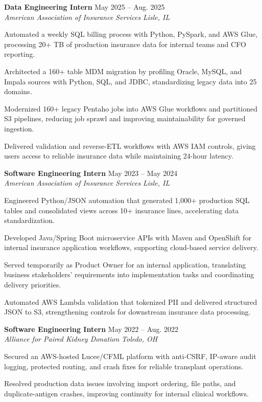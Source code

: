 \documentclass[letterpaper,11pt]{article}
\newcommand{\resumeSubheading}[4]{
  \textbf{#1} \hfill #2\\
  \textit{#3} \hfill \textit{#4}
}
\begin{document}
\resumeSubheading
{Data Engineering Intern}{May 2025 -- Aug. 2025}
{American Association of Insurance Services}{Lisle, IL}
\begin{tightitemize}
  \item Automated a weekly SQL billing process with Python, PySpark, and AWS Glue, processing 20+ TB of production insurance data for internal teams and CFO reporting.
  \item Architected a 160+ table MDM migration by profiling Oracle, MySQL, and Impala sources with Python, SQL, and JDBC, standardizing legacy data into 25 domains.
  \item Modernized 160+ legacy Pentaho jobs into AWS Glue workflows and partitioned S3 pipelines, reducing job sprawl and improving maintainability for governed ingestion.
  \item Delivered validation and reverse-ETL workflows with AWS IAM controls, giving users access to reliable insurance data while maintaining 24-hour latency.
\end{tightitemize}

\resumeSubheading
{Software Engineering Intern}{May 2023 -- May 2024}
{American Association of Insurance Services}{Lisle, IL}
\begin{tightitemize}
  \item Engineered Python/JSON automation that generated 1,000+ production SQL tables and consolidated views across 10+ insurance lines, accelerating data standardization.
  \item Developed Java/Spring Boot microservice APIs with Maven and OpenShift for internal insurance application workflows, supporting cloud-based service delivery.
  \item Served temporarily as Product Owner for an internal application, translating business stakeholders' requirements into implementation tasks and coordinating delivery priorities.
  \item Automated AWS Lambda validation that tokenized PII and delivered structured JSON to S3, strengthening controls for downstream insurance data processing.
\end{tightitemize}

\resumeSubheading
{Software Engineering Intern}{May 2022 -- Aug. 2022}
{Alliance for Paired Kidney Donation}{Toledo, OH}
\begin{tightitemize}
  \item Secured an AWS-hosted Lucee/CFML platform with anti-CSRF, IP-aware audit logging, protected routing, and crash fixes for reliable transplant operations.
  \item Resolved production data issues involving import ordering, file paths, and duplicate-antigen crashes, improving continuity for internal clinical workflows.
\end{tightitemize}
\end{document}
